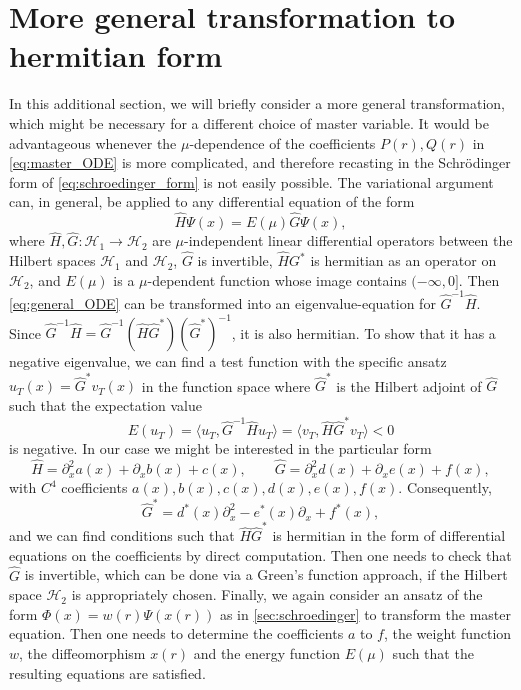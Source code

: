 \documentclass[11pt,aip,jmp,amsmath,amssymb,draft]{revtex4-1}
\begin{document}
\section{\label{sec:appendix_hermitian}More general transformation to hermitian form}
In this additional section, we will briefly consider a more general transformation, which might be necessary for a different choice of master variable. It would be advantageous whenever the $\mu$-dependence of the coefficients $P(r), Q(r)$ in \cref{eq:master_ODE} is more complicated, and therefore recasting in the Schr{\"o}dinger form of \cref{eq:schroedinger_form} is not easily possible.
The variational argument can, in general, be applied to any differential equation of the form
\begin{equation} \label{eq:general_ODE}
    \hat H \Psi(x) = E(\mu) \hat G \Psi(x),
\end{equation}
where $\hat H,\hat G: \mathcal H_1 \to \mathcal H_2$ are $\mu$-independent linear differential operators between the Hilbert spaces $\mathcal H_1$ and $\mathcal H_2$, $\hat G$ is invertible, $\hat HG^*$ is hermitian as an operator on $\mathcal H_2$, and $E(\mu)$ is a $\mu$-dependent function whose image contains $(-\infty, 0]$.
Then \cref{eq:general_ODE} can be transformed into an eigenvalue-equation for $\hat G^{-1} \hat H$. Since $\hat G^{-1}\hat H = \hat G^{-1} (\hat H\hat G^*) (\hat G^*)^{-1}$, it is also hermitian. To show that it has a negative eigenvalue, we can find a test function with the specific ansatz $u_T(x) = \hat G^* v_T(x)$ in the function space where $\hat G^*$ is the Hilbert adjoint of $\hat G$ such that the expectation value
\begin{equation} \label{eq:expectation_value_general}
    E(u_T)=\langle u_T , \hat G^{-1} \hat H  u_T \rangle = \langle v_T, \hat H \hat G^*v_T \rangle < 0
\end{equation}
is negative.
In our case we might be interested in the particular form
\begin{equation} \label{eq:general_ODE2}
    \hat H =  \partial_x^2 a(x)+  \partial_x b(x) + c(x), \qquad \hat G =  \partial_x^2d(x) + \partial_xe(x) + f(x),
\end{equation}
with $C^4$ coefficients $a(x), b(x), c(x), d(x), e(x), f(x)$. Consequently,
\begin{equation}
    \hat G^* = d^*(x)\partial_x^2 - e^*(x) \partial_x + f^*(x),
\end{equation}
and we can find conditions such that $\hat H \hat G^*$ is hermitian in the form of differential equations on the coefficients by direct computation. 
Then one needs to check that $\hat G$ is invertible, which can be done via a Green's function approach, if the Hilbert space $\mathcal H_2$ is appropriately chosen. 
Finally, we again consider an ansatz of the form $\Phi(x) = w(r)\Psi(x(r))$ as in \cref{sec:schroedinger} to transform the master equation. Then one needs to determine the coefficients $a$ to $f$, the weight function $w$, the diffeomorphism $x(r)$ and the energy function $E(\mu)$ such that the resulting equations are satisfied.
\end{document}
